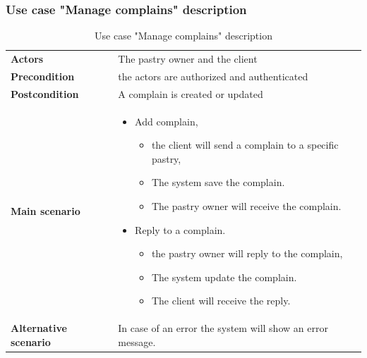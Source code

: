 \documentclass[12pt,a4paper]{report}
\begin{document}
	\subsubsection*{Use case "Manage complains" description}
		\begin{table}[H]
		\begin{center}
			\captionsetup[table]{skip=10pt}
			\caption{Use case "Manage complains" description}
			\setlength\doublerulesep{0.5pt}
			\begin{tabular}{|  p{5cm}|  p{9cm}|}
				\rowcolor{LightCyan}
				
				\hline
				\multicolumn{2}{c}{Use case "Manage complains"}\\
				\hline
				
				\textbf{Actors} &                        
			The pastry owner and the client
				\\ \hline
				
				\textbf{Precondition} &                        
				the actors are authorized and authenticated
				\\ \hline
				\textbf{Postcondition} &                        
				A complain is created or updated
				\\ \hline
				
				\textbf{Main scenario} &                        
				\begin{itemize}
					\item Add complain,
					\begin{itemize}
						\item the client will send a complain to a specific pastry,
						\item The system save the complain.
						\item The pastry owner will receive the complain.
					\end{itemize}
					\item Reply to a complain.
					
					\begin{itemize}
						\item the pastry owner will reply to the complain,
						\item The system update the complain.
						\item The client will receive the reply.
					\end{itemize}
				\end{itemize}
				\\ \hline
				
				\textbf{Alternative scenario} &                        
				In case of an error the system will show an error message.
				\\ \hline
				
				
			\end{tabular}
			
		\end{center}
		
	\end{table}
\end{document}
